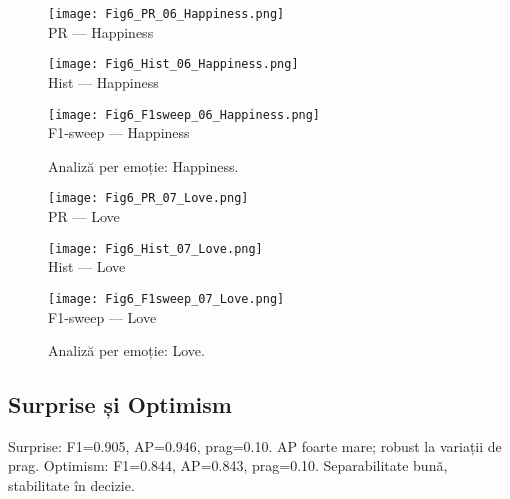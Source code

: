 \begin{figure}[H]
  \centering
  \begin{minipage}[t]{0.32\textwidth}\centering
    \texttt{[image: Fig6\_PR\_06\_Happiness.png]}\\[-1mm]
    {\scriptsize PR — Happiness}
  \end{minipage}\hfill
  \begin{minipage}[t]{0.32\textwidth}\centering
    \texttt{[image: Fig6\_Hist\_06\_Happiness.png]}\\[-1mm]
    {\scriptsize Hist — Happiness}
  \end{minipage}\hfill
  \begin{minipage}[t]{0.32\textwidth}\centering
    \texttt{[image: Fig6\_F1sweep\_06\_Happiness.png]}\\[-1mm]
    {\scriptsize F1-sweep — Happiness}
  \end{minipage}
  \caption{Analiză per emoție: Happiness.}
  \label{fig:c6-happiness}
\end{figure}

\begin{figure}[H]
  \centering
  \begin{minipage}[t]{0.32\textwidth}\centering
    \texttt{[image: Fig6\_PR\_07\_Love.png]}\\[-1mm]
    {\scriptsize PR — Love}
  \end{minipage}\hfill
  \begin{minipage}[t]{0.32\textwidth}\centering
    \texttt{[image: Fig6\_Hist\_07\_Love.png]}\\[-1mm]
    {\scriptsize Hist — Love}
  \end{minipage}\hfill
  \begin{minipage}[t]{0.32\textwidth}\centering
    \texttt{[image: Fig6\_F1sweep\_07\_Love.png]}\\[-1mm]
    {\scriptsize F1-sweep — Love}
  \end{minipage}
  \caption{Analiză per emoție: Love.}
  \label{fig:c6-love}
\end{figure}

\subsection{Surprise și Optimism}
\noindent Surprise: F1=0.905, AP=0.946, prag=0.10. AP foarte mare; robust la variații de prag.
\noindent Optimism: F1=0.844, AP=0.843, prag=0.10. Separabilitate bună, stabilitate în decizie.

